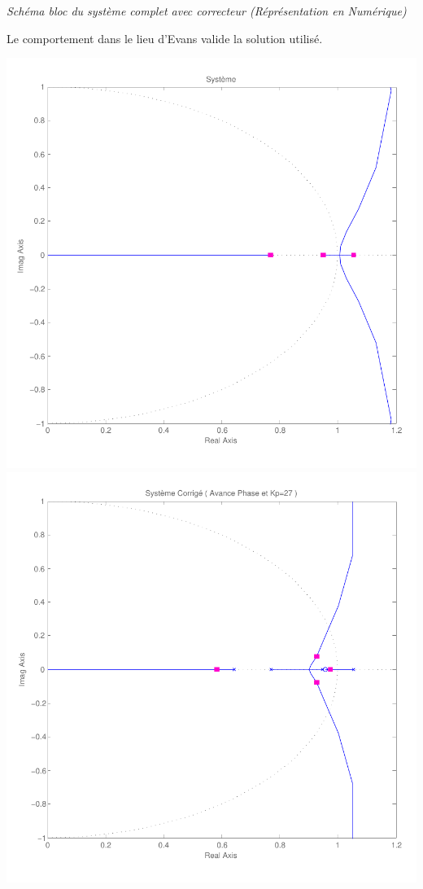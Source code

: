 \documentclass[11pt, french]{article} %
\begin{document}
\begin{center}

\emph{Schéma bloc du système complet avec correcteur (Réprésentation en Numérique)}
\end{center}

Le comportement dans le lieu d'Evans valide la solution utilisé.

\includegraphics[scale=0.50]{RLN_Sys_Seul.pdf}
\includegraphics[scale=0.50]{RLN_Sys_AvPh_K27.pdf}
\end{document}

